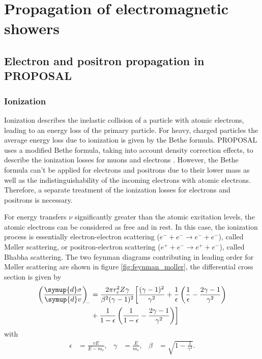 \chapter{Propagation of electromagnetic showers}

\section{Electron and positron propagation in PROPOSAL}

\subsection{Ionization}

Ionization describes the inelastic collision of a particle with atomic electrons, leading to an energy loss of the primary particle.
For heavy, charged particles the average energy loss due to ionization is given by the Bethe formula.
PROPOSAL uses a modified Bethe formula, taking into account density correction effects, to describe the ionization losses for muons and electrons \cite{Kohne:2013zbq}.
However, the Bethe formula can't be applied for electrons and positrons due to their lower mass as well as the indistinguishability of the incoming electrons with atomic electrons.
Therefore, a separate treatment of the ionization losses for electrons and positrons is necessary.

For energy transfers $\nu$ significantly greater than the atomic excitation levels, the atomic electrons can be considered as free and in rest.
In this case, the ionization process is essentially electron-electron scattering ($e^- + e^- \rightarrow e^- + e^-$), called M{\o}ller scattering, or positron-electron scattering ($e^+ + e^- \rightarrow e^+ + e^-$), called Bhabha scattering.
The two feynman diagrams contributing in leading order for M{\o}ller scattering are shown in figure \ref{fig:feynman_moller}, the differential cross section \cite{PhysRev.93.38} is given by
%
\begin{equation}
	\begin{split}
	\label{eqn:moller}
	\left(\frac{\symup{d}\sigma}{\symup{d}v}\right)_{\!\!-} &= \frac{2 \pi r_e^2 Z \gamma}{\beta^2(\gamma - 1)^2} \biggl[ \frac{(\gamma - 1)^2}{\gamma^2} + \frac{1}{\epsilon} \left( \frac{1}{\epsilon} - \frac{2\gamma - 1}{\gamma^2} \right) \\ &+ \frac{1}{1 - \epsilon} \left( \frac{1}{1 - \epsilon} - \frac{2 \gamma - 1}{\gamma^2} \right) \biggr]
	\end{split}
\end{equation}
%
with
%
\begin{align}
	\epsilon &= \frac{v E}{E - m_e},& \gamma &= \frac{E}{m_e}, & \beta &= \sqrt{1 - \frac{1}{\gamma^2}}.
\end{align}

